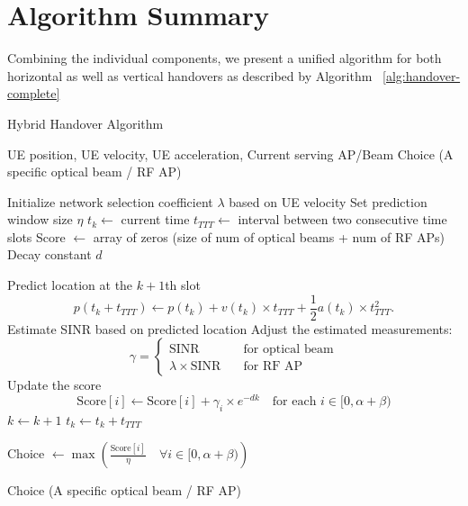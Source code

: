 \section{Algorithm Summary}
Combining the individual components, we present a unified algorithm for both horizontal as well as vertical handovers as described by Algorithm ~\ref{alg:handover-complete}
\begin{algorithm}
\caption{Hybrid Handover Algorithm}
\label{alg:handover-complete}
\begin{algorithmic}[1]
\REQUIRE UE position, UE velocity, UE acceleration, Current serving AP/Beam
\ENSURE Choice (A specific optical beam / RF AP)

\STATE Initialize network selection coefficient $\lambda$ based on UE velocity
\STATE Set prediction window size $\eta$
\STATE $t_k \leftarrow$ current time
\STATE $t_{TTT} \leftarrow$ interval between two consecutive time slots
\STATE Score $\leftarrow$ array of zeros (size of num of optical beams + num of RF APs)
\STATE Decay constant $d$

    \STATE Predict location at the $k+1$th slot
    \[
    p(t_k + t_{TTT}) \leftarrow p(t_k) + v(t_k) \times t_{TTT} + \frac{1}{2}a(t_k) \times t_{TTT}^2.
    \]
    \STATE Estimate SINR based on predicted location
    \STATE Adjust the estimated measurements:
    \[
    \gamma = 
    \begin{cases} 
    \text{SINR} \quad &\text{for optical beam} \\
    \lambda \times \text{SINR} \quad &\text{for RF AP}
    \end{cases}
    \]
    \STATE Update the score 
    \[
    \text{Score}[i] \leftarrow \text{Score}[i] + \gamma_i \times e^{-dk} \quad \text{for each } i \in [0, \alpha + \beta)
    \]
    \STATE $k \leftarrow k + 1$
    \STATE $t_k \leftarrow t_k + t_{TTT}$
\ENDWHILE

\STATE Choice $\leftarrow \max\left(\frac{\text{Score}[i]}{\eta} \quad \forall i \in [0, \alpha + \beta)\right)$

\RETURN Choice (A specific optical beam / RF AP)
\end{algorithmic}
\end{algorithm}


